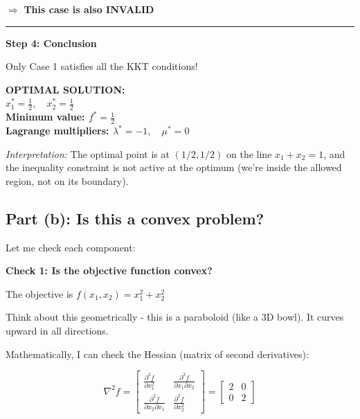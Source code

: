 \documentclass[11pt]{article}
\newenvironment{answerbox}
  {\begin{framed}\begin{center}\large\bfseries}
  {\end{center}\end{framed}}
\begin{document}
$\Rightarrow$ \textbf{This case is also INVALID}

\vspace{1em}

\noindent\rule{\textwidth}{0.4pt}

\textbf{Step 4: Conclusion}

Only Case 1 satisfies all the KKT conditions!

\begin{answerbox}
\textbf{OPTIMAL SOLUTION:}\\[0.5em]
$x_1^* = \frac{1}{2}, \quad x_2^* = \frac{1}{2}$\\[0.5em]
Minimum value: $f^* = \frac{1}{2}$\\[0.5em]
Lagrange multipliers: $\lambda^* = -1, \quad \mu^* = 0$
\end{answerbox}

\textit{Interpretation:} The optimal point is at $(1/2, 1/2)$ on the line $x_1 + x_2 = 1$, and the inequality constraint is not active at the optimum (we're inside the allowed region, not on its boundary).

\subsection{Part (b): Is this a convex problem?}

Let me check each component:

\vspace{0.5em}

\textbf{Check 1: Is the objective function convex?}

The objective is $f(x_1, x_2) = x_1^2 + x_2^2$

Think about this geometrically - this is a paraboloid (like a 3D bowl). It curves upward in all directions.

Mathematically, I can check the Hessian (matrix of second derivatives):

\begin{equation*}
\nabla^2 f = \begin{bmatrix} \frac{\partial^2 f}{\partial x_1^2} & \frac{\partial^2 f}{\partial x_1 \partial x_2} \\ \frac{\partial^2 f}{\partial x_2 \partial x_1} & \frac{\partial^2 f}{\partial x_2^2} \end{bmatrix} = \begin{bmatrix} 2 & 0 \\ 0 & 2 \end{bmatrix}
\end{equation*}
\end{document}
